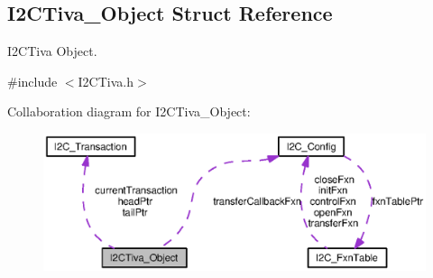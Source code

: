 \subsection{I2\+C\+Tiva\+\_\+\+Object Struct Reference}
\label{struct_i2_c_tiva___object}


I2\+C\+Tiva Object.  




{\ttfamily \#include $<$I2\+C\+Tiva.\+h$>$}



Collaboration diagram for I2\+C\+Tiva\+\_\+\+Object\+:
\nopagebreak
\begin{figure}[H]
\begin{center}
\leavevmode
\includegraphics[width=350pt]{struct_i2_c_tiva___object__coll__graph}
\end{center}
\end{figure}

